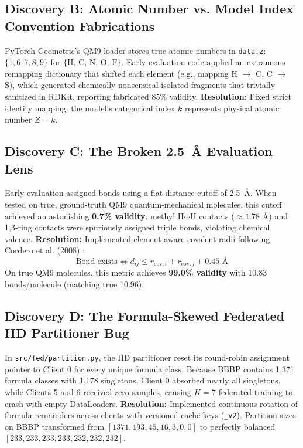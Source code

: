 \documentclass[12pt, a4paper]{article}
\begin{document}
\subsection{Discovery B: Atomic Number vs. Model Index Convention Fabrications}
PyTorch Geometric's QM9 loader stores true atomic numbers in \texttt{data.z}: $\{1, 6, 7, 8, 9\}$ for $\{\text{H, C, N, O, F}\}$. Early evaluation code applied an extraneous remapping dictionary that shifted each element (e.g., mapping H $\to$ C, C $\to$ S), which generated chemically nonsensical isolated fragments that trivially sanitized in RDKit, reporting fabricated 85\% validity.
\textbf{Resolution:} Fixed strict identity mapping: the model's categorical index $k$ represents physical atomic number $Z = k$.

\subsection{Discovery C: The Broken 2.5~\AA{} Evaluation Lens}
Early evaluation assigned bonds using a flat distance cutoff of 2.5~\AA. When tested on true, ground-truth QM9 quantum-mechanical molecules, this cutoff achieved an astonishing \textbf{0.7\% validity}: methyl H$\cdots$H contacts ($\approx 1.78\text{ \AA}$) and 1,3-ring contacts were spuriously assigned triple bonds, violating chemical valence.
\textbf{Resolution:} Implemented element-aware covalent radii following Cordero et al. (2008) \cite{cordero2008covalent}:
\begin{equation}
    \text{Bond exists} \iff d_{ij} \leq r_{\text{cov}, i} + r_{\text{cov}, j} + 0.45\text{ \AA}
\end{equation}
On true QM9 molecules, this metric achieves \textbf{99.0\% validity} with 10.83 bonds/molecule (matching true 10.96).

\subsection{Discovery D: The Formula-Skewed Federated IID Partitioner Bug}
In \texttt{src/fed/partition.py}, the IID partitioner reset its round-robin assignment pointer to Client 0 for every unique formula class. Because BBBP contains 1,371 formula classes with 1,178 singletons, Client 0 absorbed nearly all singletons, while Clients 5 and 6 received zero samples, causing $K=7$ federated training to crash with empty DataLoaders.
\textbf{Resolution:} Implemented continuous rotation of formula remainders across clients with versioned cache keys (\texttt{\_v2}). Partition sizes on BBBP transformed from $[1371, 193, 45, 16, 3, 0, 0]$ to perfectly balanced $[233, 233, 233, 233, 232, 232, 232]$.
\end{document}
